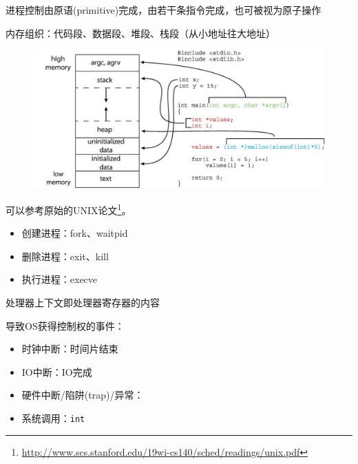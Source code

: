 进程控制由原语(primitive)完成，由若干条指令完成，也可被视为原子操作

内存组织：代码段、数据段、堆段、栈段（从小地址往大地址）
\begin{figure}[H]
\centering
\includegraphics[width=0.8\linewidth]{fig/C_memory.jpg}
\end{figure}

可以参考原始的UNIX论文\footnote{\url{http://www.scs.stanford.edu/19wi-cs140/sched/readings/unix.pdf}}。
\begin{itemize}
	\item 创建进程：fork、waitpid
	\item 删除进程：exit、kill
	\item 执行进程：execve
\end{itemize}



处理器上下文即处理器寄存器的内容


导致OS获得控制权的事件：
\begin{itemize}
	\item 时钟中断：时间片结束
	\item IO中断：IO完成
	\item 硬件中断/陷阱(trap)/异常：
	\item 系统调用：\verb'int'
\end{itemize}
